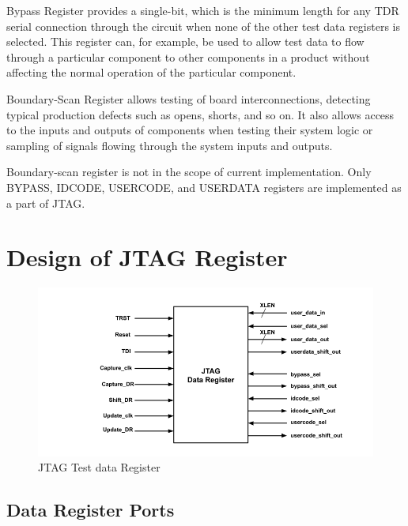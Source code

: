 Bypass Register provides a single-bit, which is the minimum length for any TDR serial connection through the circuit when none of the other test data registers is selected. This register can, for example, be used to allow test data to flow through a particular component to other components in a product without affecting the normal operation of the particular component.

Boundary-Scan Register allows testing of board interconnections, detecting typical production defects such as opens, shorts, and so on. It also allows access to the inputs and outputs of components when testing their system logic or sampling of signals flowing through the system inputs and outputs.

Boundary-scan register is not in the scope of current implementation. Only BYPASS, IDCODE, USERCODE, and USERDATA registers are implemented as a part of JTAG.

\section{Design of JTAG Register}

\vspace{1cm}
\begin{figure}[H]
    \centering
    \includegraphics[width = 15cm]{images/jtag_data_register.png}
    \vspace{1cm}
    \caption{JTAG Test data Register}
    \label{fig:data-reg}
\end{figure}
\vspace{1cm}

\subsection{Data Register Ports}

